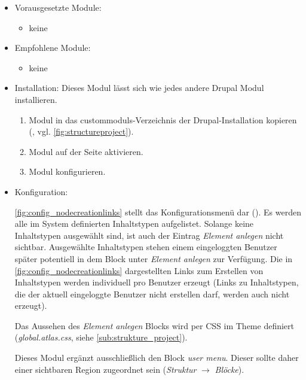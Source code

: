 \begin{itemize}[parsep=0pt, itemsep=5.0pt plus 2.0pt minus 1.0pt, leftmargin=*]
	\item Vorausgesetzte Module:
	\begin{itemize}
		\item keine
	\end{itemize}

	\item Empfohlene Module:
	\begin{itemize}
		\item keine
	\end{itemize}

	\item Installation:
	Dieses Modul lässt sich wie jedes andere Drupal Modul installieren.
	\begin{enumerate}
		\item Modul in das \glspl{custommodul}-Verzeichnis der Drupal-Installation kopieren  (\zB {}, vgl. \cref{fig:structureproject}).
		\item Modul auf der Seite  aktivieren.
		\item Modul konfigurieren.
	\end{enumerate}

	\item Konfiguration:

	\cref{fig:config_nodecreationlinks} stellt das Konfigurationsmenü dar (). Es werden alle im System definierten Inhaltstypen aufgelistet. Solange keine Inhaltstypen ausgewählt sind, ist auch der Eintrag \textit{Element anlegen} nicht sichtbar. Ausgewählte Inhaltstypen stehen einem eingeloggten Benutzer später potentiell in dem Block unter \textit{Element anlegen} zur Verfügung. Die in \cref{fig:config_nodecreationlinks} dargestellten Links zum Erstellen von Inhaltstypen werden individuell pro Benutzer erzeugt (Links zu Inhaltstypen, die der aktuell eingeloggte Benutzer nicht erstellen darf, werden auch nicht erzeugt).

	Das Aussehen des \textit{Element anlegen} Blocks wird per CSS im Theme definiert (\zB \textit{global.atlas.css}, siehe \cref{sub:strukture_project}).

	Dieses Modul ergänzt ausschließlich den Block \textit{user menu}. Dieser sollte daher einer sichtbaren Region zugeordnet sein (\textit{Struktur} $\rightarrow$ \textit{Blöcke}).

\end{itemize}




